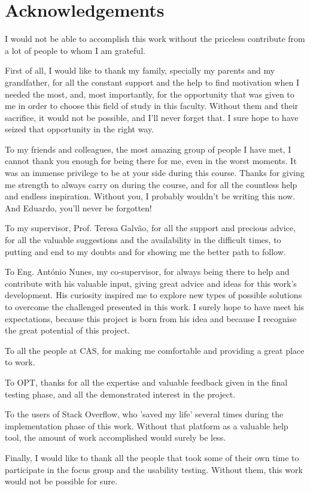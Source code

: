 \chapter*{Acknowledgements}

I would not be able to accomplish this work without the priceless contribute from a lot of people to whom I am grateful.

First of all, I would like to thank my family, specially my parents and my grandfather, for all the constant support and the help to find motivation when I needed the most, and, most importantly, for the opportunity that was given to me in order to choose this field of study in this faculty. Without them and their sacrifice, it would not be possible, and I'll never forget that. I sure hope to have seized that opportunity in the right way.

To my friends and colleagues, the most amazing group of people I have met, I cannot thank you enough for being there for me, even in the worst moments. It was an immense privilege to be at your side during this course. Thanks for giving me strength to always carry on during the course, and for all the countless help and endless inspiration. Without you, I probably wouldn't be writing this now. And Eduardo, you'll never be forgotten!

To my supervisor, Prof. Teresa Galvão, for all the support and precious advice, for all the valuable suggestions and the availability in the difficult times, to putting and end to my doubts and for showing me the better path to follow.

To Eng. António Nunes, my co-supervisor, for always being there to help and contribute with his valuable input, giving great advice and ideas for this work's development. His curiosity inspired me to explore new types of possible solutions to overcome the challenged presented in this work. I surely hope to have meet his expectations, because this project is born from his idea and because I recognise the great potential of this project.

To all the people at CAS, for making me comfortable and providing a great place to work.

To OPT, thanks for all the expertise and valuable feedback given in the final testing phase, and all the demonstrated interest in the project.

To the users of Stack Overflow, who 'saved my life' several times during the implementation phase of this work. Without that platform as a valuable help tool, the amount of work accomplished would surely be less.

Finally, I would like to thank all the people that took some of their own time to participate in the focus group and the usability testing. Without them, this work would not be possible for sure.



\vspace{10mm}
